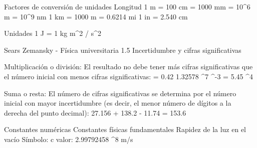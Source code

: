 Factores de conversión de unidades
Longitud
1 m = 100 cm = 1000 mm = 10^6 \mu m = 10^9 nm
1 km = 1000 m = 0.6214 mi
1 in = 2.540 cm

Unidades
1 J = 1 kg \cdot m^2 / s^2

Sears Zemansky - Física universitaria
1.5 Incertidumbre y cifras significativas

Multiplicación o división: El resultado no debe tener más cifras significativas que el número inicial con menos cifras significativas:
 = 0.42
1.32578 ^7  ^{-3} = 5.45 ^4

Suma o resta: El número de cifras significativas se determina por el número inicial con mayor incertidumbre (es decir, el menor número de dígitos a la derecha del punto decimal):
27.156 + 138.2 - 11.74 = 153.6

Constantes numéricas
Constantes físicas fundamentales
Rapidez de la luz en el vacío
    Símbolo: c
    valor: 2.99792458 ^8 m/s